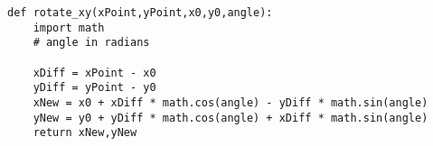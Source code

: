 
\begin{lstlisting}
def rotate_xy(xPoint,yPoint,x0,y0,angle):
	import math
	# angle in radians

	xDiff = xPoint - x0
	yDiff = yPoint - y0
	xNew = x0 + xDiff * math.cos(angle) - yDiff * math.sin(angle)
	yNew = y0 + yDiff * math.cos(angle) + xDiff * math.sin(angle)
    return xNew,yNew
\end{lstlisting}